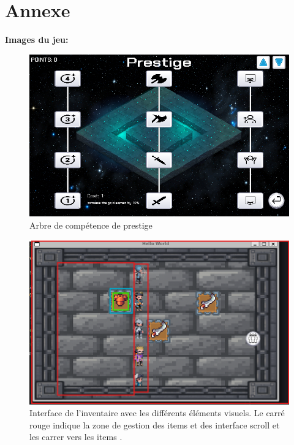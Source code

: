 \documentclass[11pt,a4paper]{article}
\begin{document}
\clearpage
\section{Annexe}
\glsaddall
\printglossary
\newpage

\textbf{Images du jeu: }\\

\begin{figure}[h] 
        \centering 
        \includegraphics[width=12cm]{img/prestige_image.png} 
        \caption{Arbre de compétence de prestige}
        \label{Arbre de compétence de prestige}
\end{figure}
\begin{figure}[h]
    \centering
    \includegraphics[width=12cm]{img/inv.png}
    \caption{Interface de l'inventaire avec les différents éléments visuels. Le carré rouge indique la zone de gestion des items et des interface scroll et les carrer vers les items .}
    \label{interface}
\end{figure}
\end{document}
